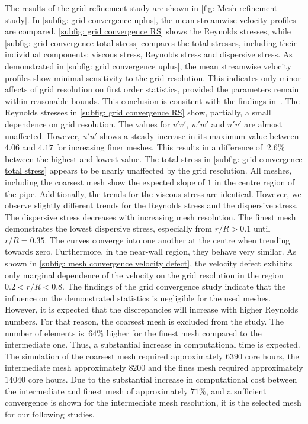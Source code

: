 The results of the grid refinement study are shown in \autoref{fig: Mesh refinement study}.
In \autoref{subfig: grid convergence uplus}, the mean streamwise velocity profiles are compared.
\autoref{subfig: grid convergence RS} shows the Reynolds stresses, while \autoref{subfig: grid convergence total stress} compares the total stresses, including their individual components: viscous stress, Reynolds stress and dispersive stress.
As demonstrated in \autoref{subfig: grid convergence uplus}, the mean streamwise velocity profiles show minimal sensitivity to the grid resolution.
This indicates only minor affects of grid resolution on first order statistics, provided the parameters remain within reasonable bounds.
This conclusion is consitent with the findings in~\citep{moinDIRECTNUMERICALSIMULATION1998}.
The Reynolds stresses in \autoref{subfig: grid convergence RS} show, partially, a small dependence on grid resolution.
The values for $v'v',\ w'w'$ and $u'v'$ are almost unaffected.
However, $u'u'$ shows a steady increase in its maximum value between $4.06$ and $4.17$ for increasing finer meshes.
This results in a difference of $~ 2.6\%$ between the highest and lowest value.
The total stress in \autoref{subfig: grid convergence total stress} appears to be nearly unaffected by the grid resolution. 
All meshes, including the coarsest mesh show the expected slope of $1$ in the centre region of the pipe.
Additionally, the trends for the viscous stress are identical.
However, we observe slightly different trends for the Reynolds stress and the dispersive stress.
The dispersive stress decreases with increasing mesh resolution.
The finest mesh demonstrates the lowest dispersive stress, especially from $r/R > 0.1$ until $r/R = 0.35$. 
The curves converge into one another at the centre when trending towards zero.
Furthermore, in the near-wall region, they behave very similar.
As shown in \autoref{subfig: mesh convergence velocity defect}, the velocity defect exhibits only marginal dependence of the velocity on the grid resolution in the region $ 0.2 < r/R < 0.8$. 
The findings of the grid convergence study indicate that the influence on the demonstrated statistics is negligible for the used meshes.
However, it is expected that the discrepancies will increase with higher Reynolds numbers.
For that reason, the coarsest mesh is excluded from the study. 
The number of elements is $~64\%$ higher for the finest mesh compared to the intermediate one.
Thus, a substantial increase in computational time is expected.
The simulation of the coarsest mesh required approximately $6390$ core hours, the intermediate mesh approximately $8200$ and the fines mesh required approximately $14040$ core hours.
Due to the substantial increase in computational cost between the intermediate and finest mesh of approximately $71\%$, and a sufficient convergence is shown for the intermediate mesh resolution, it is the selected mesh for our following studies.

